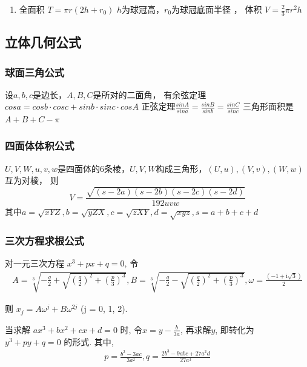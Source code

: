 \documentclass[landscape,a4paper]{article}
\begin{document}
\begin{spacing}{0.3}
\begin{multicols}{2}
\begin{enumerate}
	\item 全面积
		$T=\pi r(2h+r_0)$
		$h$为球冠高，$r_0$为球冠底面半径
	，   体积
		$V=\frac{2}{3}\pi r^2h$
\end{enumerate}

\subsection{立体几何公式}

\subsubsection{球面三角公式}

设$a, b, c$是边长，$A, B, C$是所对的二面角，
有余弦定理$cos a = cos b \cdot cos c + sin b \cdot sin c \cdot cos A$
正弦定理$\frac{sin A}{sin a} = \frac{sin B}{sin b} = \frac{sin C}{sin c}$
三角形面积是$A + B + C - \pi$

\subsubsection{四面体体积公式}

$U, V, W, u, v, w$是四面体的$6$条棱，$U, V, W$构成三角形，$(U, u), (V, v), (W, w)$ 互为对棱，
则$$V = \frac{\sqrt{(s - 2a)(s - 2b)(s - 2c)(s - 2d)}}{192 uvw}$$
其中$
        a  =  \sqrt{xYZ},
        b  =  \sqrt{yZX},
        c  =  \sqrt{zXY},
        d  =  \sqrt{xyz},
        s  =  a + b + c + d
    $

\subsubsection{三次方程求根公式}
对一元三次方程
$x ^ 3 + px + q = 0$,
令
\begin{align*}
  A = \sqrt[3]{-\frac{q}{2}+\sqrt{(\frac{q}{2})^2+(\frac{p}{3})^3}},
  B = \sqrt[3]{-\frac{q}{2}-\sqrt{(\frac{q}{2})^2+(\frac{p}{3})^3}},
  \omega = \frac{(-1 + \mathrm{i} \sqrt{3})}{2}
\end{align*}

则 $x_j = A\omega^{j} + B\omega^{2j}$ (j = 0, 1, 2).

当求解 $ax ^ 3 + bx ^ 2 + cx + d = 0$ 时, 令$x = y - \frac{b}{3a}$, 再求解$y$, 即转化为$y^3 + py + q = 0$ 的形式.
其中,
\begin{align*}
  p = \frac{b^2 - 3ac}{3a^2},
  q = \frac{2b ^ 3 - 9 abc + 27 a ^ 2 d}{27 a ^ 3}
\end{align*}


\end{multicols}
\end{spacing}
\end{document}
